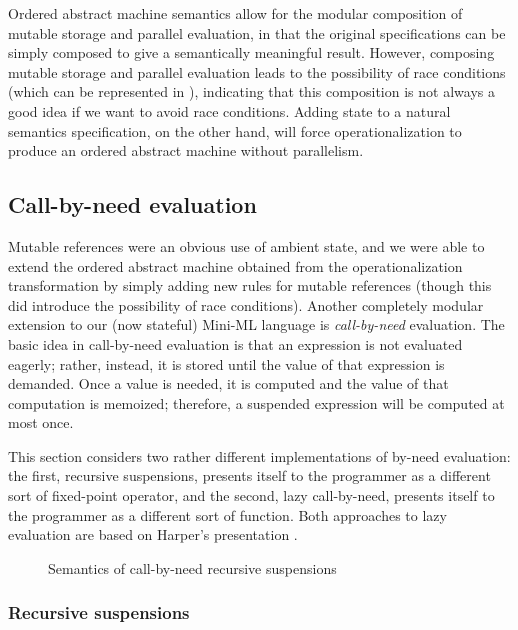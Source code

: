 Ordered abstract machine semantics allow for the modular composition
of mutable storage and parallel evaluation, in that the original
specifications can be simply composed to give a semantically
meaningful result.  However, composing mutable storage and parallel
evaluation leads to the possibility of race conditions (which can be
represented in \sls), indicating that this composition is not always a
good idea if we want to avoid race conditions. Adding state to a
natural semantics specification, on the other hand, will force
operationalization to produce an ordered abstract machine without
parallelism.

\subsection{Call-by-need evaluation}
\label{sec:call-by-need}

Mutable references were an obvious use of ambient state, and we were
able to extend the ordered abstract machine obtained from the
operationalization transformation by simply adding new rules for
mutable references (though this did introduce the possibility of race
conditions). Another completely modular extension to our (now
stateful) Mini-ML language is {\it call-by-need} evaluation. The basic
idea in call-by-need evaluation is that an expression is not evaluated
eagerly; rather, instead, it is stored until the value of that
expression is demanded. Once a value is needed, it is computed and
the value of that computation is memoized; therefore, a suspended
expression will be computed at most once.


This section considers two rather different implementations of
by-need evaluation: the first, recursive suspensions, presents itself
to the programmer as a different sort of fixed-point operator, and the
second, lazy call-by-need, presents itself to the programmer as a
different sort of function. Both approaches to lazy
evaluation are based on Harper's presentation \cite[Chapter
37]{harper12practical}.



\begin{figure}[t]
\caption{Semantics of call-by-need recursive suspensions}
\label{fig:ssos-cbneed}
\end{figure}

\subsubsection{Recursive suspensions}


